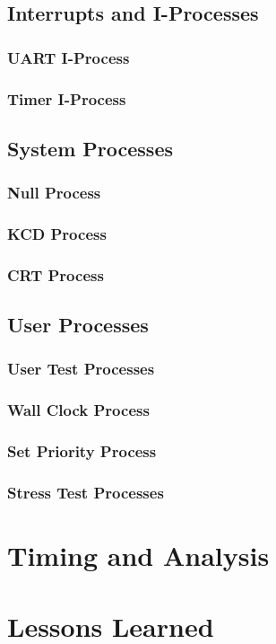 \documentclass[12pt]{report}
\begin{document}

\section{Interrupts and I-Processes}

\subsection{UART I-Process}



\subsection{Timer I-Process}


\section{System Processes}

\subsection{Null Process}


\subsection{KCD Process}


\subsection{CRT Process}



\section{User Processes}

\subsection{User Test Processes}

\subsection{Wall Clock Process}

\subsection{Set Priority Process}

\subsection{Stress Test Processes}


\chapter{Timing and Analysis}


\chapter{Lessons Learned}
\end{document}
